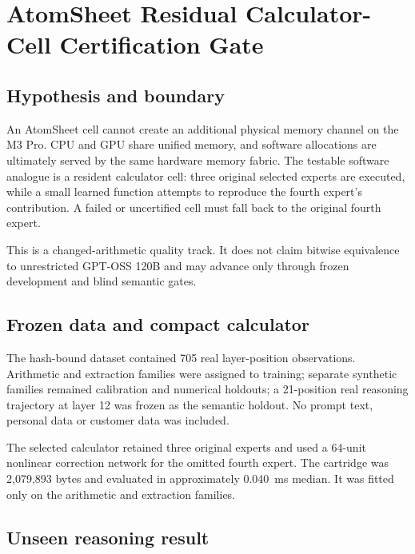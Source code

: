 
\section{AtomSheet Residual Calculator-Cell Certification Gate}
\label{sec:gptoss120b-atomsheet-residual-cell}

\subsection{Hypothesis and boundary}

An AtomSheet cell cannot create an additional physical memory channel on the
M3 Pro.  CPU and GPU share unified memory, and software allocations are
ultimately served by the same hardware memory fabric.  The testable software
analogue is a resident calculator cell: three original selected experts are
executed, while a small learned function attempts to reproduce the fourth
expert's contribution.  A failed or uncertified cell must fall back to the
original fourth expert.

This is a changed-arithmetic quality track.  It does not claim bitwise
equivalence to unrestricted GPT-OSS 120B and may advance only through frozen
development and blind semantic gates.

\subsection{Frozen data and compact calculator}

The hash-bound dataset contained 705 real layer-position observations.
Arithmetic and extraction families were assigned to training; separate
synthetic families remained calibration and numerical holdouts; a 21-position
real reasoning trajectory at layer 12 was frozen as the semantic holdout.
No prompt text, personal data or customer data was included.

The selected calculator retained three original experts and used a 64-unit
nonlinear correction network for the omitted fourth expert.  The cartridge was
2,079,893 bytes and evaluated in approximately 0.040~ms median.  It was fitted
only on the arithmetic and extraction families.

\subsection{Unseen reasoning result}

